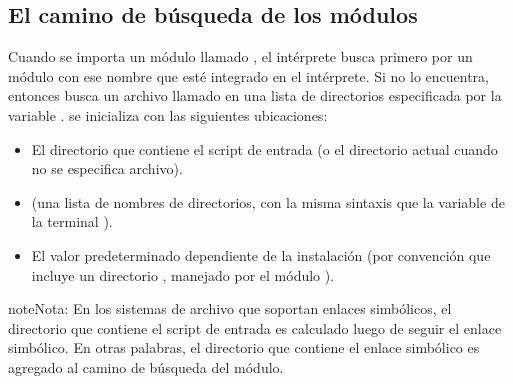 \documentclass[a5paper,10pt,spanish]{sphinxmanual}
\begin{document}
\subsection{El camino de búsqueda de los módulos}
\label{\detokenize{tutorial/modules:the-module-search-path}}\label{\detokenize{tutorial/modules:tut-searchpath}}
\ignorespaces 
\sphinxAtStartPar
Cuando se importa un módulo llamado , el intérprete busca primero por un módulo con ese nombre que esté integrado en el intérprete. Si no lo encuentra, entonces busca un archivo llamado   en una lista de directorios especificada por la variable .  se inicializa con las siguientes ubicaciones:
\begin{itemize}
\item {} 
\sphinxAtStartPar
El directorio que contiene el script de entrada (o el directorio actual cuando no se especifica archivo).

\item {} 
\sphinxAtStartPar
{} (una lista de nombres de directorios, con la misma sintaxis que la variable de la terminal ).

\item {} 
\sphinxAtStartPar
El valor predeterminado dependiente de la instalación (por convención que incluye un directorio , manejado por el módulo ).

\end{itemize}

\begin{sphinxadmonition}{note}{Nota:}
\sphinxAtStartPar
En los sistemas de archivo que soportan enlaces simbólicos, el directorio que contiene el script de entrada es calculado luego de seguir el enlace simbólico. En otras palabras, el directorio que contiene el enlace simbólico  es agregado al camino de búsqueda del módulo.
\end{sphinxadmonition}
\end{document}
